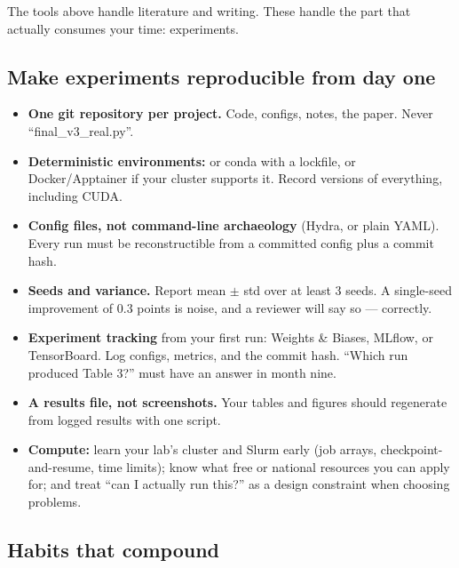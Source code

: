 \documentclass[11pt,a4paper]{article}
\begin{document}
The tools above handle literature and writing. These handle the part that
actually consumes your time: experiments.

\subsection{Make experiments reproducible from day one}

\begin{itemize}
  \item \textbf{One git repository per project.} Code, configs, notes,
        the paper. Never ``final\_v3\_real.py''.
  \item \textbf{Deterministic environments:}  or conda with a
        lockfile, or Docker/Apptainer if your cluster supports it. Record
        versions of everything, including CUDA.
  \item \textbf{Config files, not command-line archaeology} (Hydra,
        or plain YAML). Every run must be reconstructible from a committed
        config plus a commit hash.
  \item \textbf{Seeds and variance.} Report mean $\pm$ std over at least 3
        seeds. A single-seed improvement of 0.3 points is noise, and a
        reviewer will say so --- correctly.
  \item \textbf{Experiment tracking} from your first run: Weights \& Biases,
        MLflow, or TensorBoard. Log configs, metrics, and the commit hash.
        ``Which run produced Table 3?'' must have an answer in month nine.
  \item \textbf{A results file, not screenshots.} Your tables and figures
        should regenerate from logged results with one script.
  \item \textbf{Compute:} learn your lab's cluster and Slurm early (job arrays,
        checkpoint-and-resume, time limits); know what free or national
        resources you can apply for; and treat ``can I actually run this?'' as
        a design constraint when choosing problems.
\end{itemize}

\subsection{Habits that compound}
\end{document}
